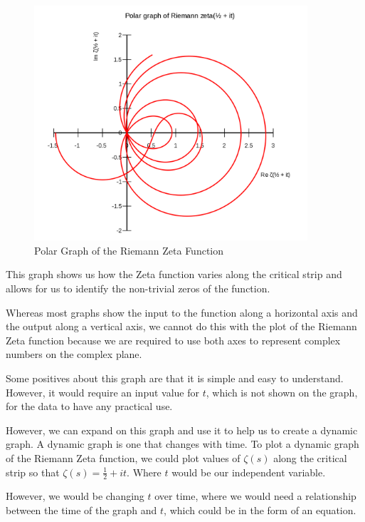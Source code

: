 \documentclass[12pt]{article}
\begin{document}
\begin{figure}[h]
    \centering
    \captionsetup{justification=centering}
    \includegraphics[width=4.0in]{Zeta-Polar-Graph}
    \caption{Polar Graph of the Riemann Zeta Function}
\end{figure}

This graph shows us how the Zeta function varies along the critical strip and allows for us to identify the non-trivial zeros of the function.

Whereas most graphs show the input to the function along a horizontal axis and the output along a vertical axis, we cannot do this with the plot of the Riemann Zeta function because we are required to use both axes to represent complex numbers on the complex plane.

Some positives about this graph are that it is simple and easy to understand. However, it would require an input value for $t$, which is not shown on the graph, for the data to have any practical use.

However, we can expand on this graph and use it to help us to create a dynamic graph. A dynamic graph is one that changes with time. To plot a dynamic graph of the Riemann Zeta function, we could plot values of $\zeta(s)$ along the critical strip so that $\zeta(s) = \frac{1}{2}+ it$. Where $t$ would be our independent variable.

However, we would be changing $t$ over time, where we would need a relationship between the time of the graph and $t$, which could be in the form of an equation.
\end{document}
